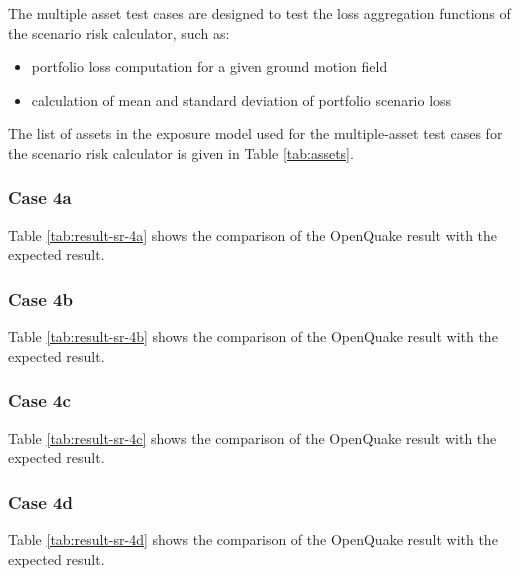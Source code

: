 The multiple asset test cases are designed to test the loss aggregation functions of the scenario risk calculator, such as:

\begin{itemize}
\item portfolio loss computation for a given ground motion field
\item calculation of mean and standard deviation of portfolio scenario loss
\end{itemize}



The list of assets in the exposure model used for the multiple-asset test cases for the scenario risk calculator is given in Table \ref{tab:assets}.

\subsubsection{Case 4a}


Table \ref{tab:result-sr-4a} shows the comparison of the OpenQuake result with the expected result.

\subsubsection{Case 4b}


Table \ref{tab:result-sr-4b} shows the comparison of the OpenQuake result with the expected result.
\subsubsection{Case 4c}


Table \ref{tab:result-sr-4c} shows the comparison of the OpenQuake result with the expected result.

\subsubsection{Case 4d}


Table \ref{tab:result-sr-4d} shows the comparison of the OpenQuake result with the expected result.

